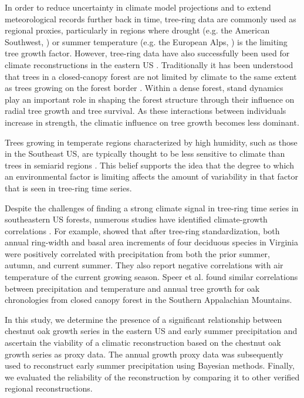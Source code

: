 In order to reduce uncertainty in climate model projections and to
extend meteorological records further back in time, tree-ring data are
commonly used as regional proxies, particularly in regions where drought
(e.g. the American Southwest, \cite{cook2004long}) or summer temperature
(e.g. the European Alps, \cite{buntgen2007growth}) is the limiting tree
growth factor. However, tree-ring data have also successfully been used
for climate reconstructions in the eastern US \cite{leblanc1993temporal,
stahle1993, cook1999drought}. Traditionally it has been understood that
trees in a closed-canopy forest are not limited by climate to the same
extent as trees growing on the forest border \cite{fritts1976tree}. Within
a dense forest, stand dynamics play an important role in shaping the
forest structure through their influence on radial tree growth and tree
survival. As these interactions between individuals increase in strength,
the climatic influence on tree growth becomes less dominant.

Trees growing in temperate regions characterized by high humidity, such
as those in the Southeast US, are typically thought to be less sensitive
to climate than trees in semiarid regions \cite{phipps1982comments}. This
belief supports the idea that the degree to which an environmental factor
is limiting affects the amount of variability in that factor that is
seen in tree-ring time series.

Despite the challenges of finding a strong climate signal in tree-ring
time series in southeastern US forests, numerous studies have identified
climate-growth correlations \cite{pan1997dendroclimatological,
speer2009climate, rubino2000dendroclimatological}. For example,
\citet{pan1997dendroclimatological} showed that after tree-ring
standardization, both annual ring-width and basal area increments
of four deciduous species in Virginia were positively correlated
with precipitation from both the prior summer, autumn, and current
summer. They also report negative correlations with air temperature
of the current growing season. Speer et al. \citet{speer2009climate}
found similar correlations between precipitation and temperature and
annual tree growth for oak chronologies from closed canopy forest in
the Southern Appalachian Mountains.

In this study, we determine the presence of a significant relationship
between chestnut oak growth series in the eastern US and early summer
precipitation and ascertain the viability of a climatic reconstruction
based on the chestnut oak growth series as proxy data. The annual growth
proxy data was subsequently used to reconstruct early summer precipitation
using Bayesian methods. Finally, we evaluated the reliability of the
reconstruction by comparing it to other verified regional reconstructions.

